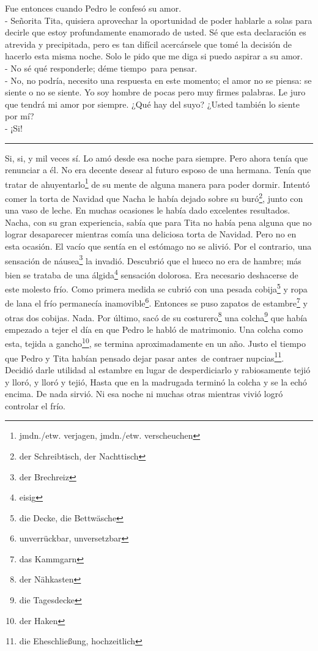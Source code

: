 Fue entonces cuando Pedro le confesó su amor.
\\- Señorita Tita, quisiera aprovechar la oportunidad de poder hablarle a %
solas para decirle que estoy profundamente enamorado de usted. Sé que %
esta declaración es atrevida y precipitada, pero es tan difícil %
acercársele que tomé la decisión de hacerlo esta misma noche. Solo le %
pido que me diga si puedo aspirar a su amor. %
\\- No sé qué responderle; déme tiempo~para pensar. %
\\- No, no podría, necesito una respuesta en este momento; el amor no se %
piensa: se siente o no se siente. Yo soy hombre de pocas pero muy firmes %
palabras. Le juro que tendrá mi amor por siempre. ¿Qué hay del suyo? %
¿Usted también lo siente por mí? %
\\- ¡Si! \\
\rule{1em}{0pt}Si, si, y mil veces sí. Lo amó desde esa noche para siempre. Pero
ahora tenía que renunciar a él. No era decente desear al futuro esposo
de una hermana. Tenía que tratar de ahuyentarlo\footnote{jmdn./etw. verjagen, jmdn./etw. verscheuchen}
de su mente de alguna manera para poder dormir. Intentó comer la torta
de Navidad que Nacha le había dejado sobre su buró\footnote{der Schreibtisch, der Nachttisch},
junto con una vaso de leche. En muchas ocasiones le había dado excelentes
resultados. Nacha, con su gran experiencia, sabía que para Tita no había
pena alguna que no lograr desaparecer mientras comía una deliciosa torta
de Navidad. Pero no en esta ocasión. El vacío que sentía en el estómago
no se alivió. Por el contrario, una sensación de náusea\footnote{der Brechreiz}
la invadió. Descubrió que el hueco no era de hambre; más bien se trataba
de una álgida\footnote{eisig} sensación dolorosa. Era
necesario deshacerse de este molesto frío. Como primera medida se cubrió
con una pesada cobija\footnote{die Decke, die Bettwäsche}
y ropa de lana el frío permanecía inamovible\footnote{unverrückbar, unversetzbar}.
Entonces se puso zapatos de estambre\footnote{das Kammgarn} y
otras dos cobijas. Nada. Por último, sacó de su costurero\footnote{der Nähkasten}
una colcha\footnote{die Tagesdecke} que había empezado a tejer el
día en que Pedro le habló de matrimonio. Una colcha como esta, tejida a gancho\footnote{der Haken}, se termina aproximadamente en un año.
Justo el tiempo que Pedro y Tita habían pensado dejar pasar antes~de contraer nupcias\footnote{die Eheschließung, hochzeitlich}.
Decidió darle utilidad al estambre en lugar de desperdiciarlo y
rabiosamente tejió y lloró, y lloró y tejió, Hasta que en la madrugada
terminó la colcha y se la echó encima. De nada sirvió. Ni esa noche ni
muchas otras mientras vivió logró controlar el frío.


